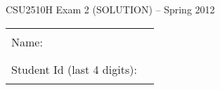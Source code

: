 \documentclass[12pt]{article}                   %
\begin{document}
\vspace*{-1.5cm}
\centerline{\Large CSU2510H Exam 2 \ifrubric (SOLUTION) \fi-- Spring 2012}

\vspace{0.5cm}

\ifrubric\relax\else
\begin{center}
\begin{tabular}{l@{\qquad}l}
Name:                        & \rule{174pt}{1pt} \\[.5cm]
Student Id (last 4 digits):  & \rule{174pt}{1pt} \\[.5cm]
\end{tabular}
\end{center}
\fi
\end{document}
